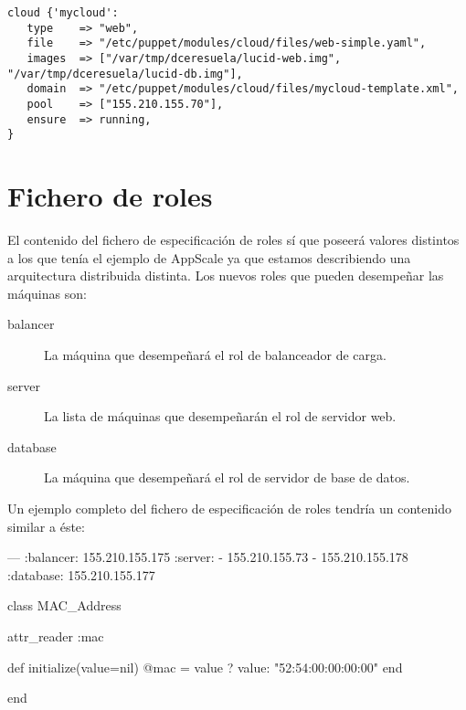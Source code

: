 {\begin{lstlisting}
cloud {'mycloud':
   type    => "web",
   file    => "/etc/puppet/modules/cloud/files/web-simple.yaml",
   images  => ["/var/tmp/dceresuela/lucid-web.img", "/var/tmp/dceresuela/lucid-db.img"],
   domain  => "/etc/puppet/modules/cloud/files/mycloud-template.xml",
   pool    => ["155.210.155.70"],
   ensure  => running,
}
\end{lstlisting}

\section{Fichero de roles}

El contenido del fichero de especificación de roles sí que poseerá valores distintos a los que tenía el ejemplo de AppScale ya que estamos describiendo una arquitectura distribuida distinta. Los nuevos roles que pueden desempeñar las máquinas son:
\begin{description}
\item[balancer] La máquina que desempeñará el rol de balanceador de carga.
\item[server] La lista de máquinas que desempeñarán el rol de servidor web.
\item[database] La máquina que desempeñará el rol de servidor de base de datos.
\end{description}

Un ejemplo completo del fichero de especificación de roles tendría un contenido similar a éste:
\begin{yamlcode}
--- 
:balancer: 155.210.155.175
:server:
- 155.210.155.73
- 155.210.155.178
:database: 155.210.155.177
\end{yamlcode}



\begin{rubycode}
class MAC_Address
   
   attr_reader :mac
   
   def initialize(value=nil)
      @mac = value ? value: "52:54:00:00:00:00"
   end
   
   
end
\end{rubycode}

}
